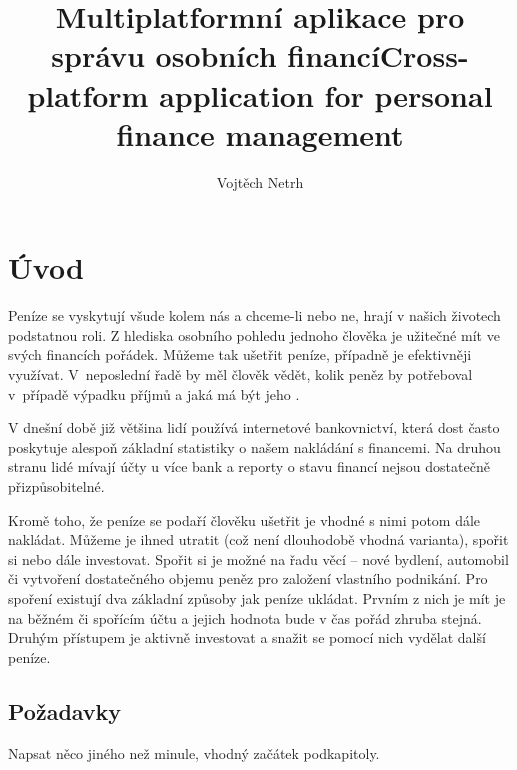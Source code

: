 \documentclass[
  biblatex,
  figures=true,
  tables=false,
  glossaries,
  index
]{kidiplom}
\title{Multiplatformní aplikace pro správu osobních financí}
\title[english]{Cross-platform application for personal finance management}
\author{Vojtěch Netrh}
\begin{document}
\maketitle



\newcommand{\BibLaTeX}{\textsc{Bib}\LaTeX}


\section{Úvod}
Peníze se vyskytují všude kolem nás a chceme-li nebo ne, hrají v našich životech podstatnou roli. Z hlediska osobního pohledu jednoho člověka je užitečné mít ve svých financích pořádek. Můžeme tak ušetřit peníze, případně je efektivněji využívat. V~neposlední řadě by měl člověk vědět, kolik peněz by potřeboval v~případě výpadku příjmů a jaká má být jeho .

V dnešní době již většina lidí používá internetové bankovnictví, která dost často poskytuje alespoň základní statistiky o našem nakládání s financemi. Na druhou stranu lidé mívají účty u více bank a reporty o stavu financí nejsou dostatečně přizpůsobitelné.

Kromě toho, že peníze se podaří člověku ušetřit je vhodné s nimi potom dále nakládat. Můžeme je ihned utratit (což není dlouhodobě vhodná varianta), spořit si nebo dále investovat. Spořit si je možné na řadu věcí -- nové bydlení, automobil či vytvoření dostatečného objemu peněz pro založení vlastního podnikání. Pro spoření existují dva základní způsoby jak peníze ukládat. Prvním z nich je mít je na běžném či spořícím účtu a jejich hodnota bude v čas pořád zhruba stejná. Druhým přístupem je aktivně investovat a snažit se pomocí nich vydělat další peníze.

\subsection{Požadavky}
Napsat něco jiného než minule, vhodný začátek podkapitoly.
\end{document}
